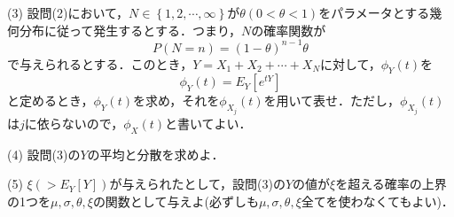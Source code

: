\documentclass[a4j]{jarticle}
\begin{document}
\begin{screen}
 (3) 設問(2)において，$N\in \left\{1,2,\cdots,\infty\right\}$が$\theta(0<\theta<1)$をパラメータとする幾何分布に従って発生するとする．つまり，$N$の確率関数が
 $$P(N=n) = (1-\theta)^{n-1}\theta$$
 で与えられるとする．このとき，$Y=X_1+X_2+\cdots+X_N$に対して，$\phi_Y(t)$を
 $$\phi_Y(t) = E_Y\left[e^{tY}\right]$$
 と定めるとき，$\phi_Y(t)$を求め，それを$\phi_{X_j}(t)$を用いて表せ．ただし，$\phi_{X_j}(t)$は$j$に依らないので，$\phi_X(t)$と書いてよい．
\end{screen}

\begin{screen}
 (4) 設問(3)の$Y$の平均と分散を求めよ．
\end{screen}

\begin{screen}
 (5) $\xi(>E_Y\left[Y\right])$が与えられたとして，設問(3)の$Y$の値が$\xi$を超える確率の上界の1つを$\mu,\sigma,\theta,\xi$の関数として与えよ(必ずしも$\mu,\sigma,\theta,\xi$全てを使わなくてもよい)．
\end{screen}
\end{document}
